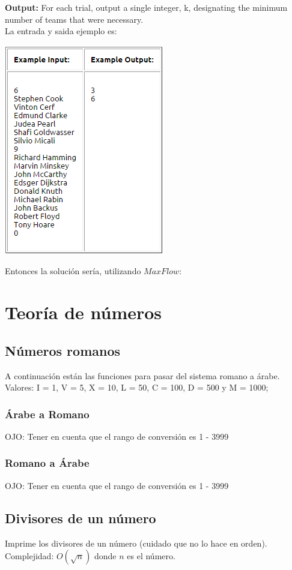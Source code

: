 \documentclass[10pt,letterpaper,twocolumn]{article}
\newcommand{\source}[1]{
	
	\dotfill
}
\begin{document}
\textbf{Output:}  For each trial, output a single integer, k, designating the minimum number of teams that were necessary.\\
\newline
La entrada y saida ejemplo es:\\
	\begin{center}
	\includegraphics{./src/konigSample.png}
	\end{center}
Entonces la solución sería, utilizando $MaxFlow$:\\
	\source{src/konigSampleCode.cpp}
\section{Teoría de números}
	\subsection{Números romanos}
		A continuación están las funciones para pasar del sistema romano a árabe.\\
		Valores: I = 1, V = 5, X = 10, L = 50, C = 100, D = 500 y M = 1000;
		\subsubsection{Árabe a Romano}
			OJO: Tener en cuenta que el rango de conversión es 1 - 3999
			\source{src/arabicToRoman.cpp}
		\subsubsection{Romano a Árabe}
			OJO: Tener en cuenta que el rango de conversión es 1 - 3999
			\source{src/romanToArabic.cpp}
		\subsection{Divisores de un número}
			Imprime los divisores de un número (cuidado que no lo hace en orden).\\
			Complejidad: $O(\sqrt{n})$ donde $n$ es el número.\\
			\source{./src/divisors.cpp}
	
\end{document}
